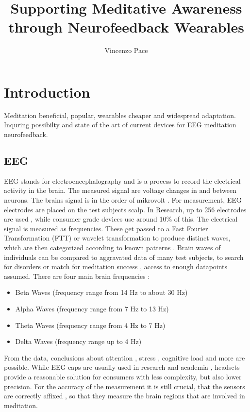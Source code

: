 \documentclass{llncs} %
\begin{document}
\title{Supporting Meditative Awareness through Neurofeedback Wearables}
\author{Vincenzo Pace}
\maketitle
\newpage
\section{Introduction}
Meditation beneficial, popular, wearables cheaper and widespread adaptation. Inquring possibilty and state of the art of current devices for EEG meditation neurofeedback.
\subsection{EEG}
EEG stands for electroencephalography and is a process to record the electrical activity in the brain. The measured signal are voltage changes in and between neurons.
The brains signal is in the order of mikrovolt \cite{Berger}.  For measurement, EEG electrodes are placed on the test subjects scalp. In Research, up to 256 electrodes are used \cite{Seeck}, while consumer grade devices use around 10\% of this. \cite{Maskeliunas}
The electrical signal is measured as frequencies. These get passed to a Fast Fourier Transformation (FTT) or wavelet transformation \cite{Akin} to produce distinct waves, which are then categorized according to known patterns \cite{Shaker}.
Brain waves of individuals can be compared to aggravated data of many test subjects, to search for disorders \cite{Loo} or match for meditation success \cite{Tang:et al}, access to enough datapoints assumed.
There are four main brain frequencies \cite{Cahn}:
\begin{itemize}
    \item 
    Beta Waves (frequency range from 14 Hz to about 30 Hz)
    \item 
    Alpha Waves (frequency range from 7 Hz to 13 Hz)
    \item 
    Theta Waves (frequency range from 4 Hz to 7 Hz)
    \item 
    Delta Waves (frequency range up to 4 Hz)
\end{itemize}
From the data, conclusions about attention \cite{Berka}, stress \cite{Hosseini}, cognitive load \cite{Antonenko} and more are possible.
While EEG caps are usually used in research and academia \cite{Seeck}, headsets provide a reasonable solution for consumers with less complexity, but also lower precision\cite{Maskeliunas}.
For the accuracy of the measurement it is still crucial, that the sensors are correctly affixed \cite{Seeck}, so that they measure the brain regions that are involved in meditation.
\end{document}

